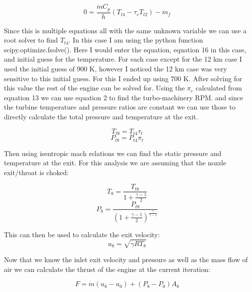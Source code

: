 \documentclass[journal ]{new-aiaa}
\begin{document}
\begin{equation}
    0 = \frac{\dot{m} C_p}{h} \left(T_{t4} - \tau_c T_{t2} \right) - \dot{m}_f
\end{equation} 

Since this is multiple equations all with the same unknown variable we can use a root solver to find $T_{t4}$. In this case I am using the python function scipy.optimize.fsolve(). Here I would enter the equation, equation 16 in this case, and initial guess for the temperature. For each case except for the 12 km case I used the initial guess of 900 K, however I noticed the 12 km case was very sensitive to this initial guess. For this I ended up using 700 K.
After solving for this value the rest of the engine can be solved for. Using the $\pi_c$ calculated from equation 13 we can use equation 2 to find the turbo-machinery RPM. and since the turbine temperature and pressure ratios are constant we can use those to directly calculate the total pressure and temperature at the exit.

\begin{equation}
    T_{t8} = T_{t4} \tau_t
\end{equation} 
\begin{equation}
    P_{t8} = P_{t4} \pi_t
\end{equation} 

\noindent Then using isentropic mach relations we can find the static pressure and temperature at the exit. For this analysis we are assuming that the nozzle exit/throat is choked:

\begin{equation}
    T_{8} = \frac{T_{t8}}{1+\frac{\gamma-1}{2}} 
\end{equation} 
\begin{equation}
    P_{8} = \frac{P_{t8}}{\left(1+\frac{\gamma-1}{2}\right)^{\frac{\gamma}{\gamma-1}}} 
\end{equation} 

\noindent This can then be used to calculate the exit velocity:
\begin{equation}
    u_{8} = \sqrt{\gamma R T_8} 
\end{equation} 

\noindent Now that we know the inlet exit velocity and pressure as well as the mass flow of air we can calculate the thrust of the engine at the current iteration:

\begin{equation}
    F = \dot{m} \left(u_8 - u_0\right)+ \left(P_8 - P_0\right) A_8
\end{equation} 
\end{document}
